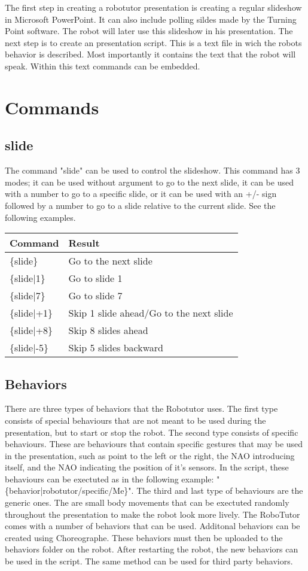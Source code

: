 The first step in creating a robotutor presentation is creating a regular slideshow in Microsoft PowerPoint. It can also include polling sildes made by the Turning Point software. The robot will later use this slideshow in his presentation. The next step is to create an presentation script. This is a text file in wich the robots behavior is described. Most importantly it contains the text that the robot will speak. Within this text commands can be embedded.


\section{Commands}
\subsection{slide}
The command "slide" can be used to control the slideshow. This command has 3 modes; it can be used without argument to go to the next slide, it can be used with a number to go to a specific slide, or it can be used with an +/- sign followed by a number to go to a slide relative to the current slide. See the following examples.


\begin{table}[h!]
\begin{tabular}{|l|l|}
\hline
Command & Result\\ \hline
\{slide\}& Go to the next slide\\ 
\{slide|1\}  & Go to slide 1\\ 
\{slide|7\}  & Go to slide 7\\ 
\{slide|+1\} & Skip 1 slide ahead/Go to the next slide \\ 
\{slide|+8\} & Skip 8 slides ahead\\ 
\{slide|-5\} & Skip 5 slides backward\\
\hline
\end{tabular}
\end{table}


\subsection{Behaviors}
There are three types of behaviors that the Robotutor uses. The first type consists of special behaviours that are not meant to be used during the presentation, but to start or stop the robot.
The second type consists of specific behaviours. These are behaviours that contain specific gestures that may be used in the presentation, such as point to the left or the right, the NAO introducing itself, and the NAO indicating the position of it's sensors. In the script, these behaviours can be exectuted as in the following example: "\{behavior|robotutor/specific/Me\}".
The third and last type of behaviours are the generic ones. The are small body movements that can be exectuted randomly throughout the presentation to make the robot look more lively.
The RoboTutor comes with a number of behaviors that can be used. Additonal behaviors can be created using Choreographe. These behaviors must then be uploaded to the behaviors folder on the robot. After restarting the robot, the new behaviors can be used in the script. The same method can be used for third party behaviors.

